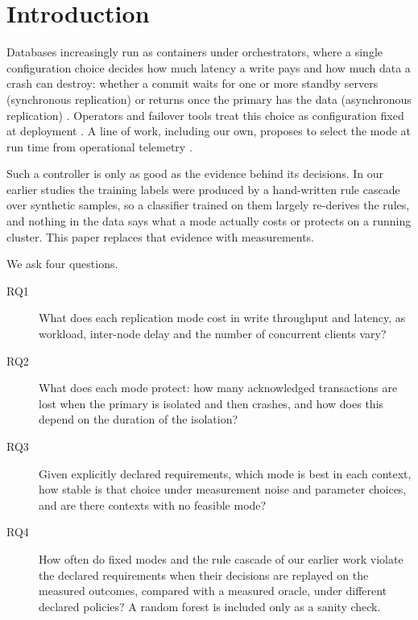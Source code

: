 \documentclass[preprint,12pt]{elsarticle}
\begin{document}
\section{Introduction}\label{sec:intro}
Databases increasingly run as containers under orchestrators, where a single configuration choice decides how much latency a write pays and how much data a crash can destroy: whether a commit waits for one or more standby servers (synchronous replication) or returns once the primary has the data (asynchronous replication) \cite{pgdocs,abadi2012}. Operators and failover tools treat this choice as configuration fixed at deployment \cite{cnpg,patroni,repmgr,stolon}. A line of work, including our own, proposes to select the mode at run time from operational telemetry \cite{jerrari2026iaha}.

Such a controller is only as good as the evidence behind its decisions. In our earlier studies \cite{jerrari2026iaha,jerrari2026cross} the training labels were produced by a hand-written rule cascade over synthetic samples, so a classifier trained on them largely re-derives the rules, and nothing in the data says what a mode actually costs or protects on a running cluster. This paper replaces that evidence with measurements.

We ask four questions.
\begin{description}
\item[RQ1] What does each replication mode cost in write throughput and latency, as workload, inter-node delay and the number of concurrent clients vary?
\item[RQ2] What does each mode protect: how many acknowledged transactions are lost when the primary is isolated and then crashes, and how does this depend on the duration of the isolation?
\item[RQ3] Given explicitly declared requirements, which mode is best in each context, how stable is that choice under measurement noise and parameter choices, and are there contexts with no feasible mode?
\item[RQ4] How often do fixed modes and the rule cascade of our earlier work violate the declared requirements when their decisions are replayed on the measured outcomes, compared with a measured oracle, under different declared policies? A random forest is included only as a sanity check.
\end{description}
\end{document}
